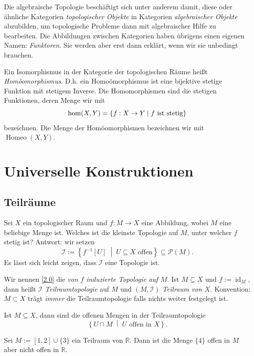 \documentclass[
12pt, 
openany, 
a4paper, 
final,
fleqn, 
]{myclass}
\numberwithin{equation}{chapter}
\numberwithin{section}{chapter}
\newcommand{\RR}{\mathbb R}
\newcommand{\powerset}[1]{\mathcal P\left(#1\right)}
\newcommand{\set}[2]{\left\{#1\;\middle|\;#2\right\}}
\DeclareMathOperator{\id}{id}
\DeclareMathOperator{\Homeo}{Homeo}
\begin{document}
Die algebraische Topologie beschäftigt sich unter anderem damit, diese oder ähnliche Kategorien \emph{topologischer Objekte} in Kategorien \emph{algebraischer Objekte} abzubilden, um topologische Probleme dann mit algebraischer Hilfe zu bearbeiten. Die Abbildungen zwischen Kategorien haben übrigens einen eigenen Namen: \emph{Funktoren}. Sie werden aber erst dann erklärt, wenn wir sie unbedingt brauchen.
\begin{defn}\label{1.31} 
Ein Isomorphismus in der Kategorie der topologischen Räume heißt \emph{Homöomorphismus}. D.h. ein Homoömorphismus ist eine bijektive stetige Funktion mit stetigem Inverse. Die Homomorphismen sind die stetigen Funktionen, deren Menge wir mit
\[ 
\hom(X, Y) = \set{f: X\to Y}{\text{$ f $ ist stetig}}
\]
bezeichnen. Die Menge der Homöomorphismen bezeichnen wir mit $ \Homeo(X, Y) $.
\end{defn}

\chapter{Universelle Konstruktionen}
\section{Teilräume}

Sei $X$ ein topologischer Raum und $f: M \to X$ eine Abbildung, wobei $M$ eine beliebige Menge ist. Welches ist die kleinste Topologie auf $M$, unter welcher $f$ stetig ist? Antwort: wir setzen 
\begin{equation}\label{2.0}
\mathcal I:= \set{f^{-1}[U]}{U\subseteq X \text{ offen}} \subseteq \powerset{M}.
\end{equation}
Es lässt sich leicht zeigen, dass $\mathcal{I}$ eine Topologie ist. 
\begin{defn}
Wir nennen \eqref{2.0} die \emph{von $f$ induzierte Topologie auf $M$}. Ist $M\subseteq X$ und $f:= \id_M$, dann heißt $\mathcal I$ \emph{Teilraumtopologie} auf $M$ und $(M, \mathcal{I})$ \emph{Teilraum von $X$}. Konvention: $M\subset X$ trägt \emph{immer} die Teilraumtopologie falls nichts weiter festgelegt ist. 
\end{defn}

Ist $M\subseteq X$, dann sind die offenen Mengen in der Teilraumtopologie
\[
\set{U\cap M}{U \text{ offen in $X$}}. 
\]

\begin{eg}\label{2.1}
Sei $M:=[1, 2]\cup \{3\}$ ein Teilraum von $\RR$. Dann ist die Menge $\{4\}$ offen in $M$ aber nicht offen in $\RR$. 
\end{eg}
\end{document}
